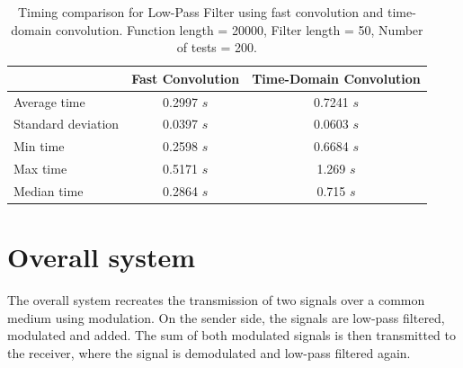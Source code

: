 \documentclass[12pt, a4paper]{report}
\begin{document}
\begin{table}[h!]
	\centering
	\begin{tabular}{|l|c|c|}
		\hline
		                   & \textbf{Fast Convolution} & \textbf{Time-Domain Convolution} \\ \hline
		Average time       & 0.2997 \(s\)              & 0.7241 \(s\)                     \\ \hline
		Standard deviation & 0.0397 \(s\)              & 0.0603 \(s\)                     \\ \hline
		Min time           & 0.2598 \(s\)              & 0.6684 \(s\)                     \\ \hline
		Max time           & 0.5171 \(s\)              & 1.269 \(s\)                      \\ \hline
		Median time        & 0.2864 \(s\)              & 0.715 \(s\)                      \\ \hline
	\end{tabular}
	\caption{Timing comparison for Low-Pass Filter using fast convolution and time-domain convolution. Function length = 20000, Filter length = 50, Number of tests = 200.}
	\label{tab:timing_comparison}
\end{table}

\chapter{Overall system}
The overall system recreates the transmission of two signals over a common medium using modulation. On the sender side, the signals are low-pass filtered, modulated and added. The sum of both modulated signals is then transmitted to the receiver,
where the signal is demodulated and low-pass filtered again.
\end{document}

